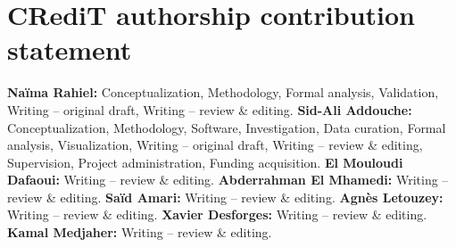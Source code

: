\ifanonyme\else
\section*{CRediT authorship contribution statement}

\textbf{Naïma Rahiel:} Conceptualization, Methodology, Formal analysis, Validation, Writing -- original draft, Writing -- review \& editing.
\textbf{Sid-Ali Addouche:} Conceptualization, Methodology, Software, Investigation, Data curation, Formal analysis, Visualization, Writing -- original draft, Writing -- review \& editing, Supervision, Project administration, Funding acquisition.
\textbf{El Mouloudi Dafaoui:} Writing -- review \& editing.
\textbf{Abderrahman El Mhamedi:} Writing -- review \& editing.
\textbf{Saïd Amari:} Writing -- review \& editing.
\textbf{Agnès Letouzey:} Writing -- review \& editing.
\textbf{Xavier Desforges:} Writing -- review \& editing.
\textbf{Kamal Medjaher:} Writing -- review \& editing.
\fi
